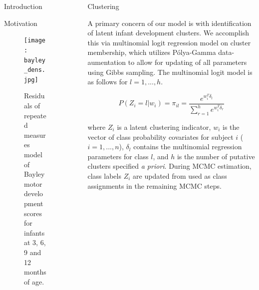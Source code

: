 \documentclass[final]{beamer}
\newlength{\sepwid}
\newlength{\onecolwid}
\newlength{\twocolwid}
\begin{document}
\begin{frame}[t]
\begin{columns}[t]
\begin{column}{\onecolwid}
\begin{block}{Introduction}
\end{block}


\begin{block}{Motivation}
\begin{figure}
\texttt{[image: bayley\_dens.jpg]}
\caption{Residuals of repeated measures model of Bayley motor development scores for infants at 3, 6, 9 and 12 months of age.}
\end{figure}
\end{block}


\end{column} %

\begin{column}{\sepwid}\end{column} %

\begin{column}{\twocolwid} %

\begin{columns}[t,totalwidth=\twocolwid] %

\begin{column}{\onecolwid}\vspace{-.6in} %

%	

\begin{block}{Clustering}

A primary concern of our model is with identification of latent infant development clusters. We accomplish this via multinomial logit regression model on cluster membership, which utilizes P\'{o}lya-Gamma data-aumentation to allow for updating of all parameters using Gibbs sampling. The multinomial logit model is as follows for $l = 1,...,h$.

$$P(Z_i = l|w_i) = \pi_{il} = \frac{e^{w_i^T \delta_l}}{\sum_{r = 1}^h e^{w_i^T \delta_r}}$$

where $Z_i$ is a latent clustering indicator, $w_i$ is the vector of class probability covariates for subject $i$ ($i = 1,...,n$), $\delta_l$ contains the multinomial regression parameters for class $l$, and $h$ is the number of putative clusters specified \textit{a priori}. During MCMC estimation, class labels $Z_i$ are updated from used as class assignments in the remaining MCMC steps.


\end{block}
\end{column}
\end{columns}
\end{column}
\end{columns}
\end{frame}
\end{document}
